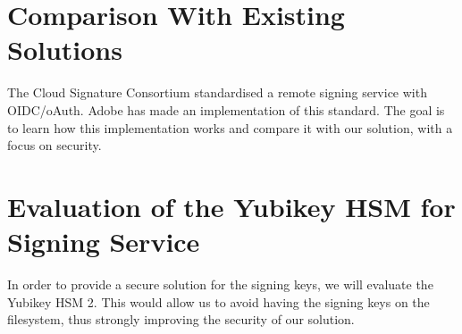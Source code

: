 \section{Comparison With Existing Solutions}
\label{section:comparison}

The Cloud Signature Consortium standardised a remote signing service with OIDC/oAuth.
Adobe has made an implementation of this standard.
The goal is to learn how this implementation works and compare it with our solution, with a focus on security.

\section{Evaluation of the Yubikey HSM for Signing Service}
\label{section:evaluateyubikey}

In order to provide a secure solution for the signing keys, we will evaluate the Yubikey HSM 2.
This would allow us to avoid having the signing keys on the filesystem, thus strongly improving the security of our solution.